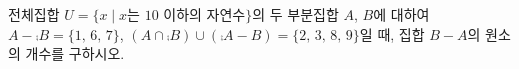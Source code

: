전체집합 $U=\{x \mid x$는 $10$ 이하의 자연수$\}$의 두 부분집합 $A$, $B$에 대하여 $A-\comp{B}=\{1,\,6,\,7\}$, $(A\cap\comp{B})\cup(\comp{A}-B)=\{2,\,3,\,8,\,9\}$일 때, 집합 $B-A$의 원소의 개수를 구하시오.
